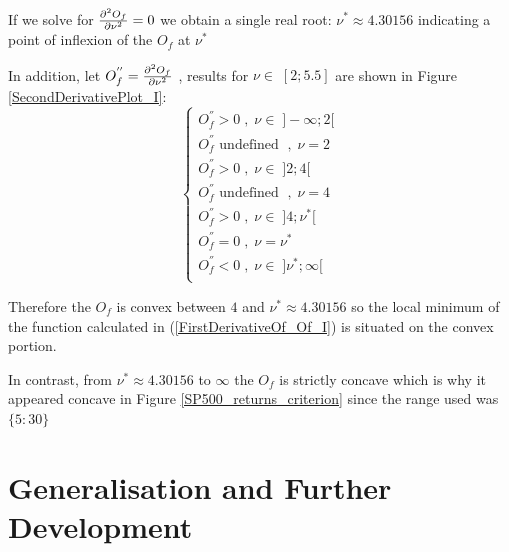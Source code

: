If we solve for $\pdv[2]{O_f}{\nu} = 0$ we obtain a single real root: $\nu^* \approx 4.30156$ indicating a point of inflexion of the $O_f$ at $\nu^*$ 
\smallskip \par
In addition, let $O_f^{''}=\pdv[2]{O_f}{\nu}$ , results for $\nu \in \; [2;5.5]$ are shown in Figure \ref{SecondDerivativePlot_I}:
\begin{equation*}
    \begin{cases}
        O_f^{''} > 0 \; , \; \nu \in \; ]-\infty;2[ \\
        O_f^{''} \text{ undefined } \; , \; \nu = 2 \\
        O_f^{''} > 0 \; , \; \nu \in \; ]2;4[ \\
        O_f^{''} \text{ undefined } \; , \; \nu = 4 \\
        O_f^{''} > 0 \; , \; \nu \in \; ]4;\nu^*[ \\
        O_f^{''} = 0 \; , \; \nu = \nu^* \\
        O_f^{''} < 0 \; , \; \nu \in \; ]\nu^*;\infty[ \\
    \end{cases}
\end{equation*}

Therefore the $O_f$ is convex between $4$ and $\nu^* \approx 4.30156$ so the local minimum of the function calculated in (\ref{FirstDerivativeOf_Of_I}) is situated on the convex portion.
\smallskip\par
In contrast, from $\nu^* \approx 4.30156$ to $\infty$ the $O_f$ is strictly concave which is why it appeared concave in Figure \ref{SP500_returns_criterion} since the range used was $\{5:30\}$

\section{Generalisation and Further Development}

